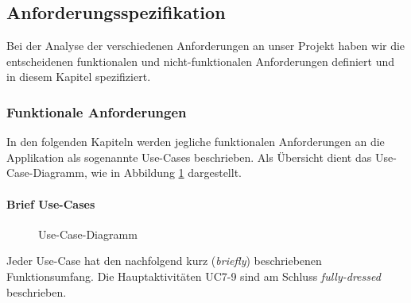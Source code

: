 \subsection{Anforderungsspezifikation}
Bei der Analyse der verschiedenen Anforderungen an unser Projekt haben wir die entscheidenen funktionalen und nicht-funktionalen Anforderungen definiert und in diesem Kapitel spezifiziert.

\subsubsection{Funktionale Anforderungen}
In den folgenden Kapiteln werden jegliche funktionalen Anforderungen an die Applikation als sogenannte Use-Cases beschrieben. Als Übersicht dient das Use-Case-Diagramm, wie in Abbildung \ref{fig:ucmethode-635} dargestellt.

\paragraph{Brief Use-Cases}


\begin{figure}[h]
	\centering
	\caption{Use-Case-Diagramm}
	\label{fig:ucmethode-635}
\end{figure}

Jeder Use-Case hat den nachfolgend kurz (\textit{briefly}) beschriebenen  Funktionsumfang. Die Hauptaktivitäten UC7-9 sind am Schluss \textit{fully-dressed} beschrieben.

